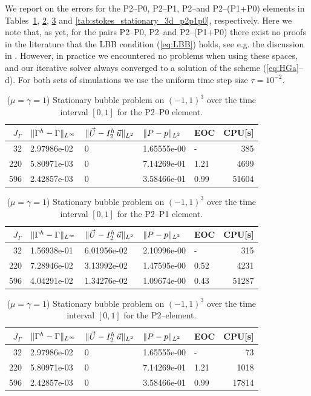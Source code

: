 We report on the errors for the P2--P0, P2--P1, P2--\pdg and P2--(P1+P0)
elements in Tables~\ref{tab:stokes_stationary_3d_p2p0},
\ref{tab:stokes_stationary_3d_p2p1}, \ref{tab:stokes_stationary_3d_p2p1dg} and
\ref{tab:stokes_stationary_3d_p2p1p0}, respectively. Here we note that, as yet,
for the pairs P2--P0, P2--\pdg and P2--(P1+P0) there exist no proofs in the
literature that the LBB condition (\ref{eq:LBB}) holds, see e.g. the discussion
in \cite[Remark~8.4.3]{BoffiBF13}. However, in practice we encountered no
problems when using these spaces, and our iterative solver always converged to a
solution of the scheme (\ref{eq:HGa}--d). For both sets of simulations we use
the uniform time step size $\tau = 10^{-2}$.
\begin{table}
\center
\begin{tabular}{rllllr}
\hline
$J_\Gamma$ & $\|\Gamma^h - \Gamma\|_{L^\infty}$ & $\|\vec U - I^h_{2}\,\vec u\|_{L^2}$ & $\|P - p\|_{L^2}$ & EOC & CPU[s] \\
\hline
 32 & 2.97986e-02 & 0 & 1.65555e-00 &    - &   385 \\
220 & 5.80971e-03 & 0 & 7.14269e-01 & 1.21 &  4699 \\
596 & 2.42857e-03 & 0 & 3.58466e-01 & 0.99 & 51604 \\
\hline
\end{tabular}
\caption[Stokes 3d stationary bubble errors P2--P0]
{($\mu=\gamma=1$) Stationary bubble problem on $(-1,1)^3$ over the time
interval $[0,1]$ for the P2--P0 element.}
\label{tab:stokes_stationary_3d_p2p0}
\end{table}
\begin{table}
\center
\begin{tabular}{rllllr}
\hline
$J_\Gamma$ & $\|\Gamma^h - \Gamma\|_{L^\infty}$ & $\|\vec U - I^h_{2}\,\vec u\|_{L^2}$ & $\|P - p\|_{L^2}$ & EOC & CPU[s] \\
\hline
 32 & 1.56938e-01 & 6.01956e-02 & 2.10996e-00 &    - &   315 \\
220 & 7.28946e-02 & 3.13992e-02 & 1.47595e-00 & 0.52 &  4231 \\
596 & 4.04291e-02 & 1.34276e-02 & 1.09674e-00 & 0.43 & 51287 \\
\hline
\end{tabular}
\caption[Stokes 3d stationary bubble errors P2--P1]
{($\mu=\gamma=1$) Stationary bubble problem on $(-1,1)^3$ over the time
interval $[0,1]$ for the P2--P1 element.}
\label{tab:stokes_stationary_3d_p2p1}
\end{table}
\begin{table}
\center
\begin{tabular}{rllllr}
\hline
$J_\Gamma$ & $\|\Gamma^h - \Gamma\|_{L^\infty}$ & $\|\vec U - I^h_{2}\,\vec u\|_{L^2}$ & $\|P - p\|_{L^2}$ & EOC & CPU[s] \\
\hline
 32 & 2.97986e-02 & 0 & 1.65555e-00 &    - &    73 \\
220 & 5.80971e-03 & 0 & 7.14269e-01 & 1.21 &  1018 \\
596 & 2.42857e-03 & 0 & 3.58466e-01 & 0.99 & 17814 \\
\hline
\end{tabular}
\caption[Stokes 3d stationary bubble errors P2--\pdg]
{($\mu=\gamma=1$) Stationary bubble problem on $(-1,1)^3$ over the time
interval $[0,1]$ for the P2--\pdg element.}
\label{tab:stokes_stationary_3d_p2p1dg}
\end{table}
